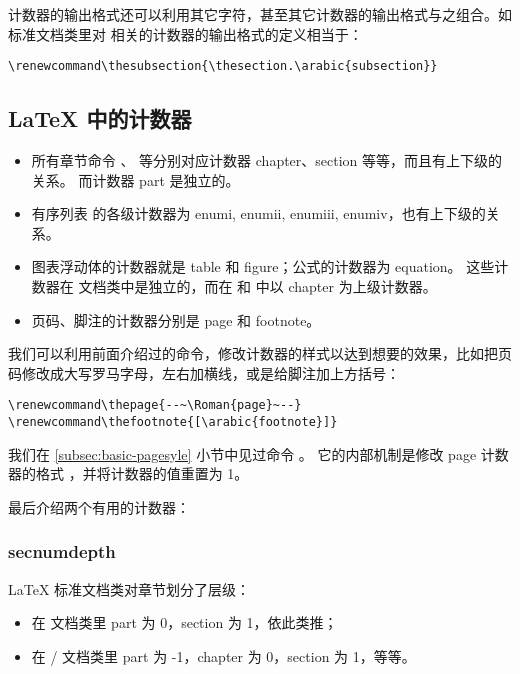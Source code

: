 计数器的输出格式还可以利用其它字符，甚至其它计数器的输出格式与之组合。如标准文档类里对  相关的计数器的输出格式的定义相当于：
\begin{verbatim}
\renewcommand\thesubsection{\thesection.\arabic{subsection}}
\end{verbatim}

\subsection{\LaTeX{} 中的计数器}\label{subsec:latex-counts}

\begin{itemize}
  \item 所有章节命令 、 等分别对应计数器 chapter、section 等等，而且有上下级的关系。
        而计数器 part 是独立的。
  \item 有序列表  的各级计数器为 enumi, enumii, enumiii, enumiv，也有上下级的关系。
  \item 图表浮动体的计数器就是 table 和 figure；公式的计数器为 equation。
        这些计数器在  文档类中是独立的，而在  和  中以 chapter 为上级计数器。
  \item 页码、脚注的计数器分别是 page 和 footnote。
\end{itemize}

我们可以利用前面介绍过的命令，修改计数器的样式以达到想要的效果，比如把页码修改成大写罗马字母，左右加横线，或是给脚注加上方括号：
\begin{verbatim}
\renewcommand\thepage{--~\Roman{page}~--}
\renewcommand\thefootnote{[\arabic{footnote}]}
\end{verbatim}

我们在 \ref{subsec:basic-pagesyle} 小节中见过命令 。
它的内部机制是修改 page 计数器的格式 ，并将计数器的值重置为 1。

最后介绍两个有用的计数器：

\subsubsection{secnumdepth}

\LaTeX{} 标准文档类对章节划分了层级：
\begin{itemize}
  \item 在  文档类里 part 为 0，section 为 1，依此类推；
  \item 在 / 文档类里 part 为 -1，chapter 为 0，section 为 1，等等。
\end{itemize}

